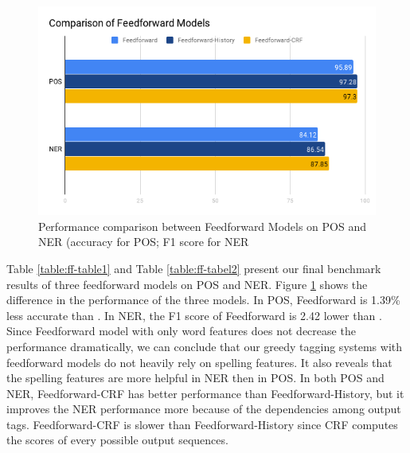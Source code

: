 \begin{figure}
  \centering
  \includegraphics[scale=0.6]{ffbar.png}
 \caption{Performance comparison between Feedforward Models on POS and NER (accuracy for POS; F1 score for NER}
  \label{fig:ff}
\end{figure}


Table \ref{table:ff-table1} and Table \ref{table:ff-tabel2} present our final benchmark results of three feedforward models on POS and NER. Figure \ref{fig:ff} shows the difference in the performance of the three models. In POS, Feedforward is 1.39\% less accurate than \ffa. In NER, the F1 score of Feedforward is 2.42 lower than \ffa. Since Feedforward model with only word features does not decrease the performance dramatically, we can conclude that our greedy tagging systems with feedforward models do not heavily rely on spelling features. It also reveals that the spelling features are more helpful in NER then in POS. In both POS and NER, Feedforward-CRF has better performance than Feedforward-History, but it improves the NER performance more because of the dependencies among output tags. Feedforward-CRF is slower than Feedforward-History since CRF computes the scores of every possible output sequences.

